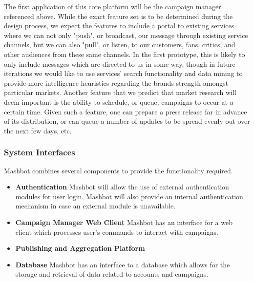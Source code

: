 \documentclass{report}
\begin{document}
The first application of this core platform will be the campaign manager referenced above. 
While the exact feature set is to be determined during the design process, we expect the 
features to include a portal to existing services where we can not only "push", or 
broadcast, our message through existing service channels, but we can also "pull", or listen, 
to our customers, fans, critics, and other audiences from these same channels. In the first 
prototype, this is likely to only include messages which are directed to us in some way, 
though in future iterations we would like to use services' search functionality and data 
mining to provide more intelligence heuristics regarding the brands strength amongst 
particular markets. Another feature that we predict that market research will deem 
important is the ability to schedule, or queue, campaigns to occur at a certain time. Given 
such a feature, one can prepare a press release far in advance of its distribution, or can 
queue a number of updates to be spread evenly out over the next few days, etc. 

		\subsubsection{System Interfaces} %
			Mashbot combines several components to provide the functionality
			required.
			\begin{itemize}
				\item \textbf{Authentication} Mashbot
                                  will allow the use of external
                                  authentication modules for user
                                  login. Mashbot will also provide an
                                  internal authentication mechanism
                                  in case an external module is
                                  unavailable.
				\item \textbf{Campaign Manager Web
                                  Client} Mashbot has an interface for
                                  a web client which processes user's
                                  commands to interact with campaigns.
				\item \textbf{Publishing and Aggregation
                                  Platform}
				\item \textbf{Database} Mashbot has an
                                  interface to a database which allows
                                  for the storage and retrieval of
                                  data related to accounts and campaigns.
			\end{itemize}
\end{document}
